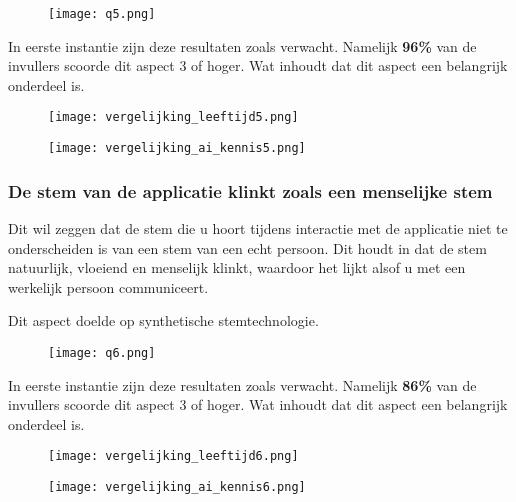\begin{figure}[htbp]
    \centering
    \texttt{[image: q5.png]}
    \label{fig:vraag_5_resultaat}
\end{figure}

In eerste instantie zijn deze resultaten zoals verwacht. Namelijk \textbf{96\%} van de invullers scoorde dit aspect 3 of hoger. Wat inhoudt dat dit aspect een belangrijk onderdeel is.

\begin{figure}[htbp]
    \centering
    \texttt{[image: vergelijking\_leeftijd5.png]}
    \label{fig:vergelijking_leeftijd5}
\end{figure}

\begin{figure}[htbp]
    \centering
    \texttt{[image: vergelijking\_ai\_kennis5.png]}
    \label{fig:vergelijking_ai_kennis5}
\end{figure}

\subsubsection{De stem van de applicatie klinkt zoals een menselijke stem}

Dit wil zeggen dat de stem die u hoort tijdens interactie met de applicatie niet te onderscheiden is van een stem van een echt persoon. Dit houdt in dat de stem natuurlijk, vloeiend en menselijk klinkt, waardoor het lijkt alsof u met een werkelijk persoon communiceert.

Dit aspect doelde op synthetische stemtechnologie.

\begin{figure}[htbp]
    \centering
    \texttt{[image: q6.png]}
    \label{fig:vraag_6_resultaat}
\end{figure}

In eerste instantie zijn deze resultaten zoals verwacht. Namelijk \textbf{86\%} van de invullers scoorde dit aspect 3 of hoger. Wat inhoudt dat dit aspect een belangrijk onderdeel is.

\begin{figure}[htbp]
    \centering
    \texttt{[image: vergelijking\_leeftijd6.png]}
    \label{fig:vergelijking_leeftijd6}
\end{figure}

\begin{figure}[htbp]
    \centering
    \texttt{[image: vergelijking\_ai\_kennis6.png]}
    \label{fig:vergelijking_ai_kennis6}
\end{figure}

